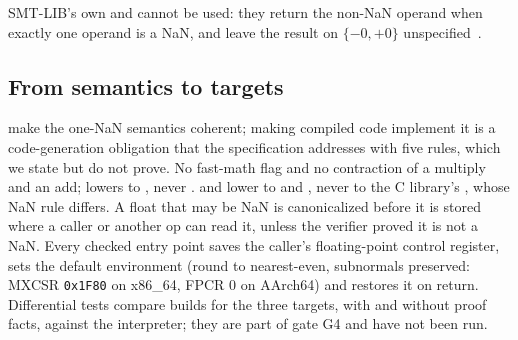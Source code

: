 SMT-LIB's own  and  cannot be used: they return the non-NaN operand when
exactly one operand is a NaN, and leave the result on $\{-0,+0\}$ unspecified~\cite{smtlib}.

\subsection{From semantics to targets}

 make the one-NaN semantics coherent; making
compiled code implement it is a code-generation obligation that the specification addresses
with five rules, which we state but do not prove. No fast-math flag and no contraction of a
multiply and an add;  lowers to , never .  and
 lower to  and , never to the C library's
, whose NaN rule differs. A float that may be NaN is canonicalized before it is stored
where a caller or another op can read it, unless the verifier proved it is not a NaN. Every
checked entry point saves the caller's floating-point control register, sets the default
environment (round to nearest-even, subnormals preserved: MXCSR \texttt{0x1F80} on x86\_64,
FPCR $0$ on AArch64) and restores it on return. Differential tests compare builds for the three
targets, with and without proof facts, against the interpreter; they are part of gate G4 and
have not been run.

